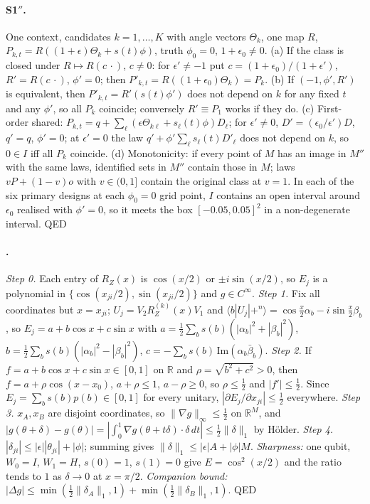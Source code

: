 \documentclass[10pt,twocolumn]{article}
\theoremstyle{definition}
\theoremstyle{remark}
\renewcommand{\qedsymbol}{{\normalfont\small QED}}
\newcommand{\R}{\mathbb{R}}
\newcommand{\eps}{\epsilon}
\newcommand{\RZ}{R_Z}
\begin{document}
\paragraph{S1$''$.} One context, candidates $k=1,\dots,K$ with angle vectors $\Theta_k$, one map $R$, $P_{k,t}=R((1+\eps)\Theta_k+s(t)\phi)$, truth $\phi_0=0$, $1+\eps_0\neq0$.
(a) If the class is closed under $R\mapsto R(c\,\cdot)$, $c\neq0$: for $\eps'\neq-1$ put $c=(1+\eps_0)/(1+\eps')$, $R'=R(c\,\cdot)$, $\phi'=0$; then $P'_{k,t}=R((1+\eps_0)\Theta_k)=P_k$.
(b) If $(-1,\phi',R')$ is equivalent, then $P'_{k,t}=R'(s(t)\phi')$ does not depend on $k$ for any fixed $t$ and any $\phi'$, so all $P_k$ coincide; conversely $R'\equiv P_1$ works if they do.
(c) First-order shared: $P_{k,t}=q+\sum_\ell(\eps\Theta_{k\ell}+s_\ell(t)\phi)D_\ell$; for $\eps'\neq0$, $D'=(\eps_0/\eps')D$, $q'=q$, $\phi'=0$; at $\eps'=0$ the law $q'+\phi'\sum_\ell s_\ell(t)D'_\ell$ does not depend on $k$, so $0\in I$ iff all $P_k$ coincide.
(d) Monotonicity: if every point of $M$ has an image in $M''$ with the same laws, identified sets in $M''$ contain those in $M$; laws $vP+(1-v)o$ with $v\in(0,1]$ contain the original class at $v=1$.
In each of the six primary designs at each $\phi_0=0$ grid point, $I$ contains an open interval around $\eps_0$ realised with $\phi'=0$, so it meets the box $[-0.05,0.05]^2$ in a non-degenerate interval. \hfill\qedsymbol

\paragraph{.} \emph{Step 0.} Each entry of $\RZ(x)$ is $\cos(x/2)$ or $\pm i\sin(x/2)$, so $E_j$ is a polynomial in $\{\cos(x_{ji}/2),\sin(x_{ji}/2)\}$ and $g\in C^\infty$. \emph{Step 1.} Fix all coordinates but $x=x_{ji}$; $U_j=V_2\RZ^{(k)}(x)V_1$ and $\langle b|U_j|{+}^n\rangle=\cos\tfrac x2\alpha_b-i\sin\tfrac x2\beta_b$, so $E_j=a+b\cos x+c\sin x$ with $a=\tfrac12\sum_bs(b)(|\alpha_b|^2+|\beta_b|^2)$, $b=\tfrac12\sum_bs(b)(|\alpha_b|^2-|\beta_b|^2)$, $c=-\sum_bs(b)\,\mathrm{Im}(\alpha_b\bar\beta_b)$. \emph{Step 2.} If $f=a+b\cos x+c\sin x\in[0,1]$ on $\R$ and $\rho=\sqrt{b^2+c^2}>0$, then $f=a+\rho\cos(x-x_0)$, $a+\rho\le1$, $a-\rho\ge0$, so $\rho\le\tfrac12$ and $|f'|\le\tfrac12$. Since $E_j=\sum_bs(b)p(b)\in[0,1]$ for every unitary, $|\partial E_j/\partial x_{ji}|\le\tfrac12$ everywhere. \emph{Step 3.} $x_A,x_B$ are disjoint coordinates, so $\|\nabla g\|_\infty\le\tfrac12$ on $\R^M$, and $|g(\theta+\delta)-g(\theta)|=|\int_0^1\nabla g(\theta+t\delta)\cdot\delta\,dt|\le\tfrac12\|\delta\|_1$ by Hölder. \emph{Step 4.} $|\delta_{ji}|\le|\eps||\theta_{ji}|+|\phi|$; summing gives $\|\delta\|_1\le|\eps|A+|\phi|M$. \emph{Sharpness:} one qubit, $W_0=I$, $W_1=H$, $s(0)=1$, $s(1)=0$ give $E=\cos^2(x/2)$ and the ratio tends to $1$ as $\delta\to0$ at $x=\pi/2$. \emph{Companion bound:} $|\Delta g|\le\min(\tfrac12\|\delta_A\|_1,1)+\min(\tfrac12\|\delta_B\|_1,1)$. \hfill\qedsymbol
\end{document}
